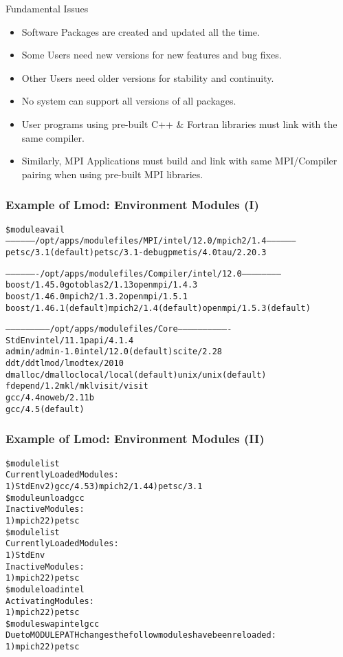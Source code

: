 \documentclass[dvipsnames,aspectratio=169]{beamer}
\begin{document}
\begin{frame}{Fundamental Issues}
  \begin{itemize}
    \item Software Packages are created and updated all the time.
    \item Some Users need new versions for new features and bug fixes.
    \item Other Users need older versions for stability and continuity.
    \item No system can support all versions of all packages.
    \item User programs using pre-built C++ \& Fortran libraries must
      link with the same compiler.
    \item Similarly, MPI Applications must build and link with same
      MPI/Compiler pairing when using pre-built MPI libraries.
  \end{itemize}
\end{frame}

\begin{frame}[fragile]
    \frametitle{Example of Lmod: Environment Modules (I)}
    {\tiny
\begin{alltt}
\$ {\color{blue} module avail}
------------------ /opt/apps/modulefiles/MPI/intel/12.0/mpich2/1.4 ------------------
  petsc/3.1 (default)    petsc/3.1-debug    pmetis/4.0    tau/2.20.3

------------------- /opt/apps/modulefiles/Compiler/intel/12.0 -----------------------
  boost/1.45.0              gotoblas2/1.13          openmpi/1.4.3
  boost/1.46.0              mpich2/1.3.2            openmpi/1.5.1
  boost/1.46.1 (default)    mpich2/1.4 (default)    openmpi/1.5.3 (default)

-------------------------- /opt/apps/modulefiles/Core -------------------------------
  StdEnv               intel/11.1               papi/4.1.4
  admin/admin-1.0      intel/12.0 (default)     scite/2.28
  ddt/ddt              lmod/lmod                tex/2010
  dmalloc/dmalloc      local/local (default)    unix/unix (default)
  fdepend/1.2          mkl/mkl                  visit/visit
  gcc/4.4              noweb/2.11b
  gcc/4.5 (default)
\end{alltt}
    }
\end{frame}

\begin{frame}[fragile]
    \frametitle{Example of Lmod: Environment Modules (II)}
    {\tiny
\begin{alltt}
{\color{blue}\$ module list}
Currently Loaded Modules:
  1) StdEnv  2) gcc/4.5  3) mpich2/1.4  4) petsc/3.1
{\color{blue}\$ module unload gcc}
Inactive Modules:
  1) mpich2  2) petsc
{\color{blue}\$ module list}
Currently Loaded Modules:
  1) StdEnv
Inactive Modules:
  1) mpich2  2) petsc
{\color{blue}\$ module load intel}
Activating Modules:
  1) mpich2  2) petsc
{\color{blue}\$ module swap intel gcc}
Due to MODULEPATH changes the follow modules have been reloaded:
  1) mpich2  2) petsc
\end{alltt}
    }
\end{frame}
\end{document}
